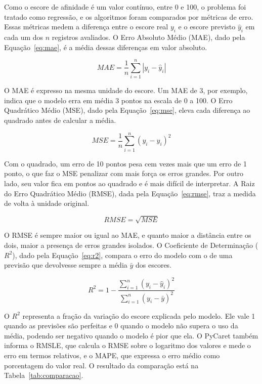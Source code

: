 Como o escore de afinidade é um valor contínuo, entre 0 e 100, o problema foi tratado como regressão, e os algoritmos foram comparados por métricas de erro. Essas métricas medem a diferença entre o escore real $y_i$ e o escore previsto $\hat{y}_i$ em cada um dos $n$ registros avaliados. O Erro Absoluto Médio (MAE), dado pela Equação~\ref{eq:mae}, é a média dessas diferenças em valor absoluto.

\begin{equation}
MAE = \frac{1}{n} \sum_{i=1}^{n} \left| y_i - \hat{y}_i \right|
\label{eq:mae}
\end{equation}

O MAE é expresso na mesma unidade do escore. Um MAE de 3, por exemplo, indica que o modelo erra em média 3 pontos na escala de 0 a 100. O Erro Quadrático Médio (MSE), dado pela Equação~\ref{eq:mse}, eleva cada diferença ao quadrado antes de calcular a média.

\begin{equation}
MSE = \frac{1}{n} \sum_{i=1}^{n} \left( y_i - \hat{y}_i \right)^2
\label{eq:mse}
\end{equation}

Com o quadrado, um erro de 10 pontos pesa cem vezes mais que um erro de 1 ponto, o que faz o MSE penalizar com mais força os erros grandes. Por outro lado, seu valor fica em pontos ao quadrado e é mais difícil de interpretar. A Raiz do Erro Quadrático Médio (RMSE), dada pela Equação~\ref{eq:rmse}, traz a medida de volta à unidade original.

\begin{equation}
RMSE = \sqrt{MSE}
\label{eq:rmse}
\end{equation}

O RMSE é sempre maior ou igual ao MAE, e quanto maior a distância entre os dois, maior a presença de erros grandes isolados. O Coeficiente de Determinação ($R^2$), dado pela Equação~\ref{eq:r2}, compara o erro do modelo com o de uma previsão que devolvesse sempre a média $\bar{y}$ dos escores.

\begin{equation}
R^2 = 1 - \frac{\sum_{i=1}^{n} \left( y_i - \hat{y}_i \right)^2}{\sum_{i=1}^{n} \left( y_i - \bar{y} \right)^2}
\label{eq:r2}
\end{equation}

O $R^2$ representa a fração da variação do escore explicada pelo modelo. Ele vale 1 quando as previsões são perfeitas e 0 quando o modelo não supera o uso da média, podendo ser negativo quando o modelo é pior que ela. O PyCaret também informa o RMSLE, que calcula o RMSE sobre o logaritmo dos valores e mede o erro em termos relativos, e o MAPE, que expressa o erro médio como porcentagem do valor real. O resultado da comparação está na Tabela~\ref{tab:comparacao}.

